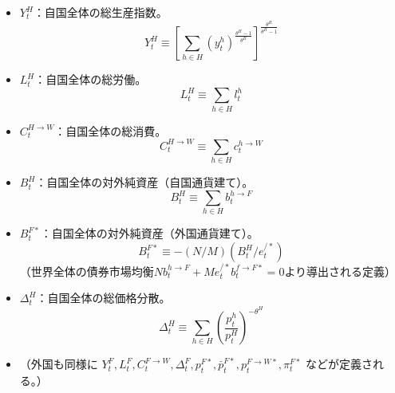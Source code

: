 \begin{itemize}
    \label{itm:model_variables_endogenous_aggregate_pi_F_W_star}
        \(\pi_t^{F\to W*}\)：外国の消費者物価指数グロス・インフレ率
        （\(\bar{p}_t^{F\to W*}/\bar{p}_{t-1}^{F\to W*}\)）。
    \item
    \label{itm:model_variables_endogenous_aggregate_Y_H}
        \(Y_t^H\)：自国全体の総生産指数。
        \begin{equation}
        \label{form:model_variables_endogenous_aggregate_Y_H_def}
            Y_t^H\equiv\left[\sum_{h\in H}(y_t^h)^{\frac{\theta^H-1}{\theta^H}}\right]^{\frac{\theta^H}{\theta^H-1}}
        \end{equation}
    \item
    \label{itm:model_variables_endogenous_aggregate_L_H}
        \(L_t^H\)：自国全体の総労働。
        \begin{equation}
        \label{form:model_variables_endogenous_aggregate_L_H_def}
            L_t^H\equiv\sum_{h\in H}l_t^h
        \end{equation}
    \item
    \label{itm:model_variables_endogenous_aggregate_C_H_W}
        \(C_t^{H\to W}\)：自国全体の総消費。
        \begin{equation}
        \label{form:model_variables_endogenous_aggregate_C_H_W_def}
            C_t^{H\to W}\equiv\sum_{h\in H}c_t^{h\to W}
        \end{equation}
    \item
    \label{itm:model_variables_endogenous_aggregate_B_H}
        \(B_t^H\)：自国全体の対外純資産（自国通貨建て）。
        \begin{equation}
        \label{form:model_variables_endogenous_aggregate_B_H_def}
            B_t^H\equiv\sum_{h\in H}b_t^{h\to F}
        \end{equation}
    \item
    \label{itm:model_variables_endogenous_aggregate_B_F_star}
        \(B_t^{F*}\)：自国全体の対外純資産（外国通貨建て）。
        \begin{equation}
        \label{form:model_variables_endogenous_aggregate_B_F_star_def}
            B_t^{F*}\equiv-(N/M)(B_t^H/e_t^{/*})
        \end{equation}
        （世界全体の債券市場均衡\(Nb_t^{h\to F}+Me_t^{/*}b_t^{f\to F*}=0\)より導出される定義）
    \item
    \label{itm:model_variables_endogenous_aggregate_Delta_H}
        \(\Delta_t^H\)：自国全体の総価格分散。
        \begin{equation}
        \label{form:model_variables_endogenous_aggregate_Delta_H_def}
            \Delta_t^H\equiv\sum_{h\in H}\left(\frac{p_t^h}{p_t^H}\right)^{-\theta^H}
        \end{equation}
    \item
    \label{itm:model_variables_endogenous_aggregate_foreign}
        （外国も同様に
        \(Y_t^F,L_t^F,C_t^{F\to W},\Delta_t^F,p_t^{F*},\bar{p}_t^{F*},p_t^{F\to W*},\pi_t^{F*}\)
        などが定義される。）
\end{itemize}
